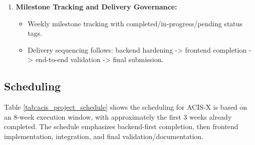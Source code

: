 \documentclass[a4paper, 12pt]{report}
\begin{document}
\begin{enumerate}[itemsep=-4pt, label=\textbf{\roman*.}, itemsep=\parskip, parsep=0pt]
    \item \textbf{Milestone Tracking and Delivery Governance: }
    \vspace{-4pt}
    \begin{itemize}[itemsep=-4pt]
        \item Weekly milestone tracking with completed/in-progress/pending status tags.
        \item Delivery sequencing follows: backend hardening -> frontend completion -> end-to-end validation -> final submission.
    \end{itemize}
\end{enumerate}

\subsection{Scheduling}
Table \ref{tab:acis_project_schedule} shows the scheduling for ACIS-X is based on an 8-week execution window, with approximately the first 3 weeks already completed. The schedule emphasizes backend-first completion, then frontend implementation, integration, and final validation/documentation.
\end{document}
